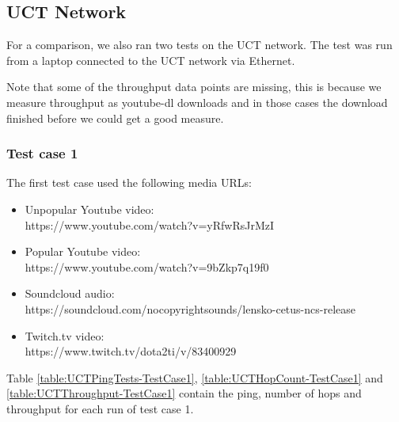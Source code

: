 \documentclass{sig-alternate-05-2015}
\begin{document}
\subsection{UCT Network}
For a comparison, we also ran two tests on the UCT network. The test was run from a laptop connected to the UCT network via Ethernet.

Note that some of the throughput data points are missing, this is because we measure throughput as youtube-dl downloads and in those cases the download finished before we could get a good measure.
\subsubsection{Test case 1}
The first test case used the following media URLs:
\begin{itemize}
	\item Unpopular Youtube video: \\ 
	https://www.youtube.com/watch?v=yRfwRsJrMzI
	\item Popular Youtube video: \\
	https://www.youtube.com/watch?v=9bZkp7q19f0
	\item Soundcloud audio: \\ https://soundcloud.com/nocopyrightsounds/lensko-cetus-ncs-release
	\item Twitch.tv video: \\ https://www.twitch.tv/dota2ti/v/83400929
\end{itemize}
Table \ref{table:UCTPingTests-TestCase1}, \ref{table:UCTHopCount-TestCase1} and \ref{table:UCTThroughput-TestCase1} contain the ping, number of hops and throughput for each run of test case 1.
\end{document}
